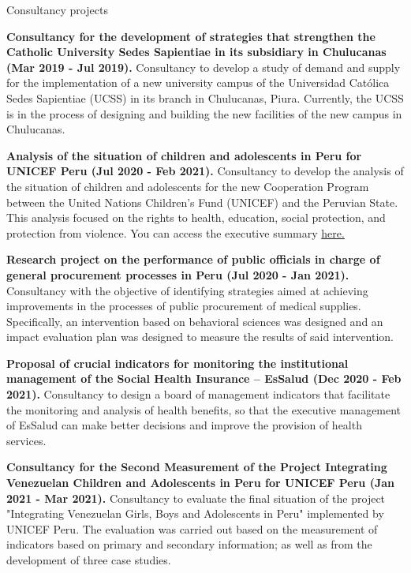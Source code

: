 \documentclass{resume} %
\begin{document}
\pagebreak
\begin{rSection}{Consultancy projects}
\item \textbf{Consultancy for the development of strategies that strengthen the Catholic University Sedes Sapientiae in its subsidiary in Chulucanas (Mar 2019 - Jul 2019).} {Consultancy to develop a study of demand and supply for the implementation of a new university campus of the Universidad Católica Sedes Sapientiae (UCSS) in its branch in Chulucanas, Piura. Currently, the UCSS is in the process of designing and building the new facilities of the new campus in Chulucanas.}
\item \textbf{Analysis of the situation of children and adolescents in Peru for UNICEF Peru (Jul 2020 - Feb 2021).} {Consultancy to develop the analysis of the situation of children and adolescents for the new Cooperation Program between the United Nations Children's Fund (UNICEF) and the Peruvian State. This analysis focused on the rights to health, education, social protection, and protection from violence. You can access the executive summary \href{https://www.unicef.org/peru/media/12141/file/Resumen Ejecutivo: Situaci%C3%B3n de ni%C3%B1as, ni%C3%B1os y adolescentes en el Per%C3%BA .pdf}{here.}}
\item \textbf{Research project on the performance of public officials in charge of general procurement processes in Peru (Jul 2020 - Jan 2021).} {Consultancy with the objective of identifying strategies aimed at achieving improvements in the processes of public procurement of medical supplies. Specifically, an intervention based on behavioral sciences was designed and an impact evaluation plan was designed to measure the results of said intervention.}
\item \textbf{Proposal of crucial indicators for monitoring the institutional management of the Social Health Insurance – EsSalud (Dec 2020 - Feb 2021).} {Consultancy to design a board of management indicators that facilitate the monitoring and analysis of health benefits, so that the executive management of EsSalud can make better decisions and improve the provision of health services.}
\item \textbf{Consultancy for the Second Measurement of the Project Integrating Venezuelan Children and Adolescents in Peru for UNICEF Peru (Jan 2021 - Mar 2021).} {Consultancy to evaluate the final situation of the project "Integrating Venezuelan Girls, Boys and Adolescents in Peru" implemented by UNICEF Peru. The evaluation was carried out based on the measurement of indicators based on primary and secondary information; as well as from the development of three case studies.}

\end{rSection}
\end{document}

